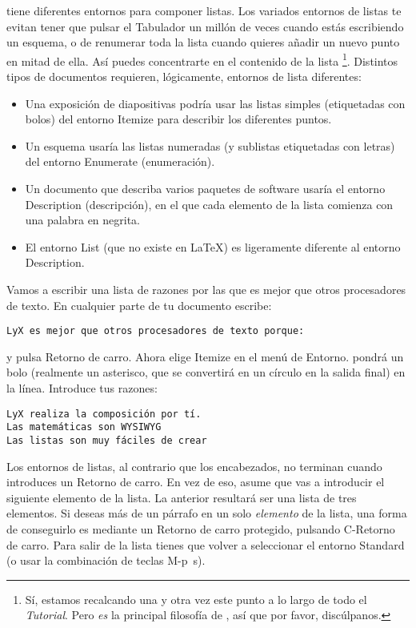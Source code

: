 \LyX{} tiene diferentes entornos para componer listas. Los variados
entornos de listas te evitan tener que pulsar el \textsf{Tabulador}
un millón de veces cuando estás escribiendo un esquema, o de renumerar
toda la lista cuando quieres añadir un nuevo punto en mitad de ella.
Así puedes concentrarte en el contenido de la lista%
\footnote{Sí, estamos recalcando una y otra vez este punto a lo largo de todo
el \emph{Tutorial}. Pero \emph{es} la principal filosofía de \LyX{},
así que por favor, discúlpanos.%
}. Distintos tipos de documentos requieren, lógicamente, entornos de
lista diferentes:

\begin{itemize}
\item Una exposición de diapositivas podría usar las listas simples (etiquetadas
con bolos) del entorno \textsf{Itemize} para describir los diferentes
puntos.
\item Un esquema usaría las listas numeradas (y sublistas etiquetadas con
letras) del entorno \textsf{Enumerate} (enumeración). 
\item Un documento que describa varios paquetes de software usaría el entorno
\textsf{Description} (descripción), en el que cada elemento de la
lista comienza con una palabra en negrita. 
\item El entorno \textsf{List} (que no existe en \LaTeX{}) es ligeramente
diferente al entorno \textsf{Description}.
\end{itemize}
Vamos a escribir una lista de razones por las que \LyX{} es mejor
que otros procesadores de texto. En cualquier parte de tu documento
escribe:

\begin{verbatim}
LyX es mejor que otros procesadores de texto porque:
\end{verbatim}

y pulsa \textsf{Retorno de carro}. Ahora elige \textsf{Itemize} en
el menú de \textsf{Entorno}. \LyX{} pondrá un bolo (realmente un asterisco,
que se convertirá en un círculo en la salida final) en la línea. Introduce
tus razones:

\begin{verbatim}
LyX realiza la composición por tí.
Las matemáticas son WYSIWYG
Las listas son muy fáciles de crear
\end{verbatim}

Los entornos de listas, al contrario que los encabezados, no terminan
cuando introduces un \textsf{Retorno de carro}. En vez de eso, \LyX{}
asume que vas a introducir el siguiente elemento de la lista. La anterior
resultará ser una lista de tres elementos. Si deseas más de un párrafo
en un solo \emph{elemento} de la lista, una forma de conseguirlo es
mediante un \textsf{Retorno de carro protegido}, pulsando \textsf{C-Retorno
de carro}. Para salir de la lista tienes que volver a seleccionar
el entorno \textsf{Standard} (o usar la combinación de teclas \textsf{M-p~s}).

